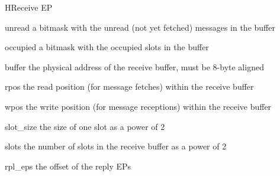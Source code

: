 \begin{register}{H}{Receive EP}{}
  \regnewline%
  \regnewline%
  \regnewline%
  \regnewline%
  \begin{regdesc}\begin{reglist}
    \item[unread] a bitmask with the unread (not yet fetched) messages in the buffer
    \item[occupied] a bitmask with the occupied slots in the buffer
    \item[buffer] the physical address of the receive buffer, must be 8-byte aligned
    \item[rpos] the read position (for message fetches) within the receive buffer
    \item[wpos] the write position (for message receptions) within the receive buffer
    \item[slot\_size] the size of one slot as a power of 2
    \item[slots] the number of slots in the receive buffer as a power of 2
    \item[rpl\_eps] the offset of the reply EPs
  \end{reglist}\end{regdesc}
\end{register}

